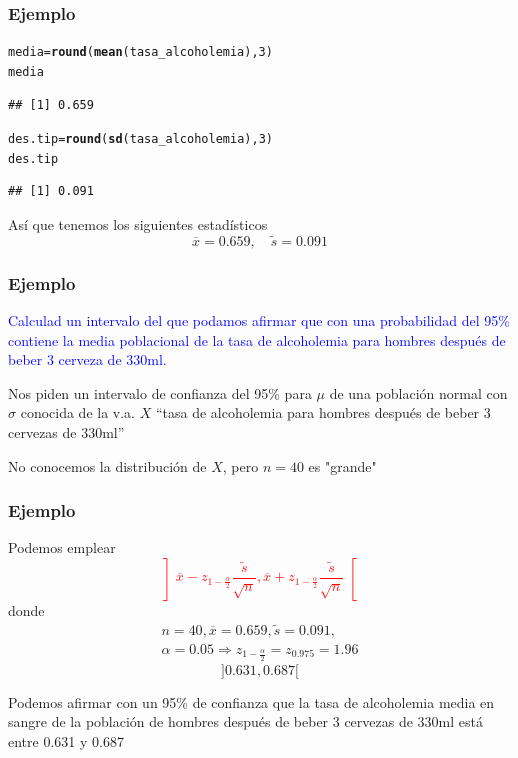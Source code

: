 \documentclass[12pt,t]{beamer}\usepackage[]{graphicx}\usepackage[]{color}
\makeatletter
\newcommand{\hlnum}[1]{\textcolor[rgb]{0.686,0.059,0.569}{#1}}%
\newcommand{\hlstd}[1]{\textcolor[rgb]{0.345,0.345,0.345}{#1}}%
\newcommand{\hlkwb}[1]{\textcolor[rgb]{0.69,0.353,0.396}{#1}}%
\newcommand{\hlkwd}[1]{\textcolor[rgb]{0.737,0.353,0.396}{\textbf{#1}}}%
\newenvironment{kframe}{%
 \def\at@end@of@kframe{}%
 \ifinner\ifhmode%
  \def\at@end@of@kframe{\end{minipage}}%
  \begin{minipage}{\columnwidth}%
 \fi\fi%
 \def\FrameCommand##1{\hskip\@totalleftmargin \hskip-\fboxsep
 \colorbox{shadecolor}{##1}\hskip-\fboxsep
     \hskip-\linewidth \hskip-\@totalleftmargin \hskip\columnwidth}%
 \MakeFramed {\advance\hsize-\width
   \@totalleftmargin\z@ \linewidth\hsize
   \@setminipage}}%
 {\par\unskip\endMakeFramed%
 \at@end@of@kframe}
\newenvironment{knitrout}{}{} %
\newcommand{\red}[1]{\textcolor{red}{#1}}
\newcommand{\blue}[1]{\textcolor{blue}{#1}}
\renewcommand{\emph}[1]{{\color{red}#1}}
\theoremstyle{plain}
\theoremstyle{definition}
\makeatother
\begin{document}
\begin{frame}[fragile]
\frametitle{Ejemplo}
\vspace*{-2ex}

\begin{knitrout}\scriptsize
{}\color{fgcolor}\begin{kframe}
\begin{alltt}
\hlstd{media}\hlkwb{=}\hlkwd{round}\hlstd{(}\hlkwd{mean}\hlstd{(tasa_alcoholemia),}\hlnum{3}\hlstd{)}
\hlstd{media}
\end{alltt}
\begin{verbatim}
## [1] 0.659
\end{verbatim}
\begin{alltt}
\hlstd{des.tip}\hlkwb{=}\hlkwd{round}\hlstd{(}\hlkwd{sd}\hlstd{(tasa_alcoholemia),}\hlnum{3}\hlstd{)}
\hlstd{des.tip}
\end{alltt}
\begin{verbatim}
## [1] 0.091
\end{verbatim}
\end{kframe}
\end{knitrout}
Así que tenemos los siguientes estadísticos
$$
\overline{x}=0.659,\quad \widetilde{s}=0.091
$$


\end{frame}


\begin{frame}
\frametitle{Ejemplo}
\blue{Calculad  un intervalo del que podamos afirmar que con una probabilidad del 95\% contiene la media poblacional de  la tasa de alcoholemia  para hombres después de beber 3 cerveza de 330ml.}
\medskip

Nos piden un \emph{intervalo de confianza  del 95\%}  para $\mu$ de una población normal con $\sigma$ conocida  de la v.a. $X$ ``tasa de alcoholemia  para hombres después de beber 3 cervezas de 330ml''

No conocemos la distribución de  $X$, pero $n=40$ es "grande"
\end{frame}

\begin{frame}
\frametitle{Ejemplo}
Podemos emplear
\red{$$
\left]\overline{x}-z_{1-\frac{\alpha}{2}}\frac{\widetilde{s}}{\sqrt{n}},
    \overline{x}+z_{1-\frac{\alpha}{2}}\frac{\widetilde{s}}{\sqrt{n}}\right[
$$}
donde
$$
\begin{array}{c}
n=40,\overline{x}=0.659,\widetilde{s}=0.091,\\[1ex]
\alpha=0.05\Rightarrow z_{1-\frac{\alpha}{2}}=z_{0.975}=1.96
\end{array}
$$
$$
]0.631, 0.687[
$$

Podemos afirmar con un 95\% de confianza  que la tasa de alcoholemia media en sangre de la población de hombres después de  beber  3  cervezas de 330ml está entre 
0.631 y 
0.687

\end{frame}
\end{document}
